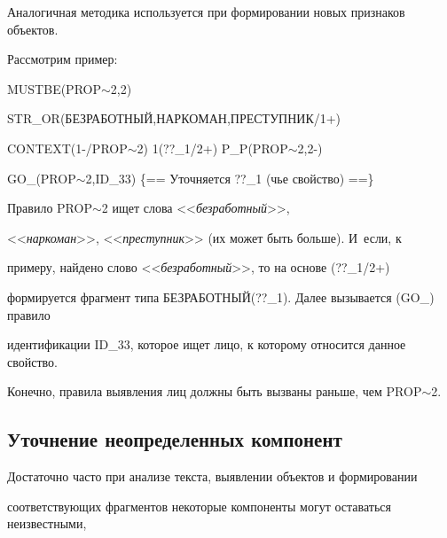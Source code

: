  Аналогичная методика используется при формировании новых признаков объектов. 


Рассмотрим пример:





     \smallskip


   


{\sf MUSTBE(PROP$\sim$2,2)





STR\_OR(БЕЗРАБОТНЫЙ,НАРКОМАН,ПРЕСТУПНИК/1+)





CONTEXT(1-/PROP$\sim$2) 1(??\_1/2+)  P\_P(PROP$\sim$2,2-) 





GO\_(PROP$\sim$2,ID\_33) \{== Уточняется ??\_1 (чье свойство) ==\}}





     \smallskip





   Правило {\sf PROP$\sim$2}  ищет слова <<\textit{безработный}>>, 


<<\textit{наркоман}>>, <<\textit{преступник}>> (их может быть больше). И~если, к 


примеру, найдено слово <<\textit{безработный}>>, то на основе {(??\_1/2+)}  


формируется фрагмент типа {\sf БЕЗРАБОТНЫЙ(??\_1)}. Далее вызывается ({\sf GO\_}) правило 


идентификации {\sf ID\_33}, которое ищет лицо, к которому относится данное свойство. 


Конечно, правила выявления лиц должны быть вызваны раньше, чем {\sf PROP$\sim$2}.


   


   \subsection{Уточнение неопределенных компонент}


   


   Достаточно часто при анализе текста, выявлении объектов и формировании 


соответствующих фрагментов некоторые компоненты могут оставаться неизвестными,


